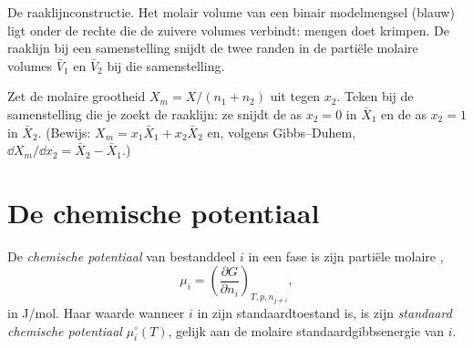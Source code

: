 \begin{omfigure}

{\small De raaklijnconstructie. Het molair volume van een binair modelmengsel
(blauw) ligt onder de rechte die de zuivere volumes verbindt: mengen
doet krimpen. De raaklijn bij een samenstelling snijdt de twee randen in de partiële
molaire volumes $\bar V_1$ en $\bar V_2$ bij die samenstelling.}
\end{omfigure}

\begin{method}\label{met:b2:chemical-potential:tangent}
Zet de molaire grootheid $X_m = X/(n_1 + n_2)$ uit tegen $x_2$. Teken bij de
samenstelling die je zoekt de raaklijn: ze snijdt de as $x_2 = 0$ in
$\bar X_1$ en de as $x_2 = 1$ in $\bar X_2$. (Bewijs: $X_m = x_1\bar X_1 +
x_2\bar X_2$ en, volgens Gibbs--Duhem, $\dd X_m/\dd x_2 = \bar X_2 - \bar X_1$.)
\end{method}

\section{De chemische potentiaal}

\begin{definition}\label{def:b2:chemical-potential:chemical-potential}
De \emph{chemische potentiaal} van bestanddeel $i$ in
een fase is zijn partiële molaire ,
\[
  \mu_i = \left(\frac{\partial G}{\partial n_i}\right)_{T, p, n_{j\ne i}} ,
\]
in \unit{J/mol}. Haar waarde wanneer $i$ in zijn standaardtoestand is, is zijn
\emph{standaard chemische potentiaal}
$\mu_i^\circ(T)$, gelijk aan de molaire standaardgibbsenergie van $i$.
\end{definition}

